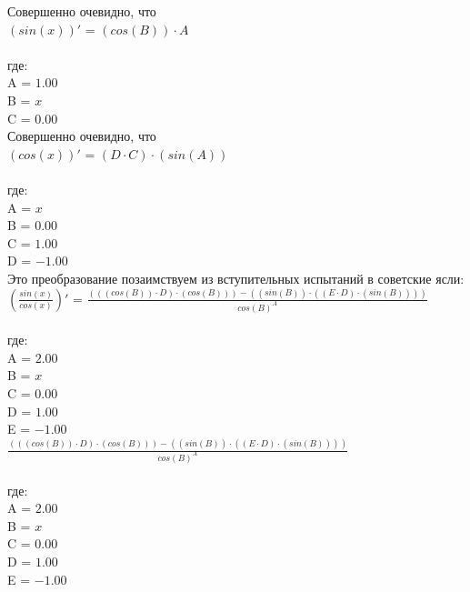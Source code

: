 \documentclass{article}
\begin{document}
Совершенно очевидно, что\n\n
\\$(sin(x))'$ = $(cos(B)) \cdot A$\\\\ где:\\
A = $1.00$\\
B = $x$\\
C = $0.00$\\
Совершенно очевидно, что\n\n
\\$(cos(x))'$ = $(D \cdot C) \cdot (sin(A))$\\\\ где:\\
A = $x$\\
B = $0.00$\\
C = $1.00$\\
D = $-1.00$\\
Это преобразование позаимствуем из вступительных испытаний в советские ясли:\n\n
\\$(\frac{sin(x)}{cos(x)})'$ = $\frac{(((cos(B)) \cdot D) \cdot (cos(B))) - ((sin(B)) \cdot ((E \cdot D) \cdot (sin(B))))}{{cos(B)}^{A}}$\\\\ где:\\
A = $2.00$\\
B = $x$\\
C = $0.00$\\
D = $1.00$\\
E = $-1.00$\\
$\frac{(((cos(B)) \cdot D) \cdot (cos(B))) - ((sin(B)) \cdot ((E \cdot D) \cdot (sin(B))))}{{cos(B)}^{A}}$\\\\ где:\\
A = $2.00$\\
B = $x$\\
C = $0.00$\\
D = $1.00$\\
E = $-1.00$\\
\end{document}
